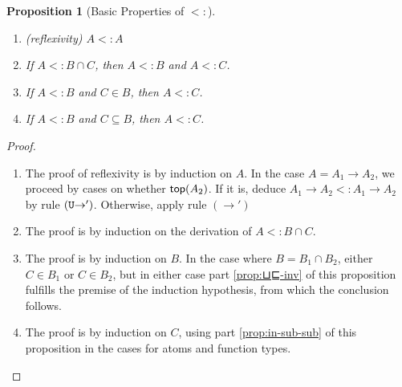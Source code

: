 \documentclass{article}
\newtheorem{proposition}[theorem]{Proposition}
\begin{document}
\begin{proposition}[Basic Properties of $<:$]\ \label{prop:subtyping}
  \begin{enumerate}
  \item (reflexivity) $A <: A$ \label{prop:⊑-refl}
  \item If $A <: B \cap C$, then $A <: B$ and $A <: C$. \label{prop:⊔⊑-inv}
  \item If $A <: B$ and $C \in B$, then $A <: C$.\label{prop:in-sub-sub}
  \item If $A <: B$ and $C \subseteq B$, then $A <: C$.\label{prop:subset-sub-sub}
  \end{enumerate}
\end{proposition}
\begin{proof}\ 
  \begin{enumerate}
  \item The proof of reflexivity is by induction on $A$. In the case
    $A = A_1 \to A_2$, we proceed by cases on whether $\mathsf{top}(A_2)$.
    If it is, deduce $A_1 \to A_2 <: A_1 \to A_2$ by rule $(\mathtt{U}{\to}')$.
    Otherwise, apply rule $(\to')$
  \item The proof is by induction on the derivation of $A <: B \cap C$.
  \item The proof is by induction on $B$. In the case where $B = B_1
    \cap B_2$, either $C \in B_1$ or $C \in B_2$, but in either case part
    \ref{prop:⊔⊑-inv} of this proposition fulfills the premise of
    the induction hypothesis, from which the conclusion follows.
  \item The proof  is by induction on $C$, using part \ref{prop:in-sub-sub}
    of this proposition in the cases for atoms and function types.
  \end{enumerate}
\end{proof}
\end{document}
